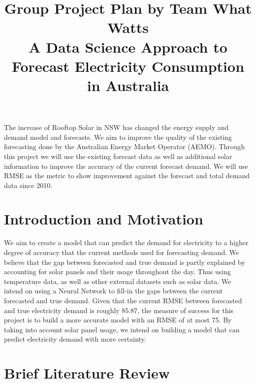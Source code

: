 \documentclass[mstat,12pt]{unswthesis}
\title{Group Project Plan by Team What Watts\\[0.5cm]A Data Science
Approach to Forecast Electricity Consumption in Australia}
\author{\Authornameonly}
\begin{document}
\beforepreface


The increase of Rooftop Solar in NSW has changed the energy supply and
demand model and forecasts. We aim to improve the quality of the
existing forecasting done by the Australian Energy Market Operator
(AEMO). Through this project we will use the existing forecast data as
well as additional solar information to improve the accuracy of the
current forecast demand. We will use RMSE as the metric to show
improvement against the forecast and total demand data since 2010.



\afterpreface





%
%






\setcounter{chapter}{1}
\renewcommand\thesection{\arabic{section}}

\hypertarget{introduction-and-motivation}{%
\section{Introduction and
Motivation}\label{introduction-and-motivation}}

We aim to create a model that can predict the demand for electricity to
a higher degree of accuracy that the current methods used for
forecasting demand. We believe that the gap between forecasted and true
demand is partly explained by accounting for solar panels and their
usage throughout the day. Thus using temperature data, as well as other
external datasets such as solar data. We intend on using a Neural
Network to fill-in the gaps between the current forecasted and true
demand. Given that the current RMSE between forecasted and true
electricity demand is roughly 85.87, the measure of success for this
project is to build a more accurate model with an RMSE of at most 75. By
taking into account solar panel usage, we intend on building a model
that can predict electricity demand with more certainty.

\hypertarget{brief-literature-review}{%
\section{Brief Literature Review}\label{brief-literature-review}}
\end{document}
